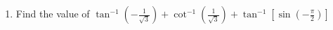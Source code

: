  \begin{enumerate}
	 \item Find the value of $\tan^{-1} (-\frac{1}{\sqrt{3}}) + \cot^{-1}(\frac{1}{\sqrt{3}}) + \tan^{-1}[\sin(-\frac{\pi}{2})]$
 \end{enumerate}

